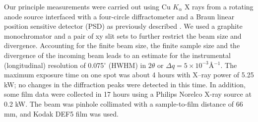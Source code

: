 


Our principle measurements were carried out using Cu $K_{\alpha}$ X rays
from a rotating anode source interfaced with a four-circle diffractometer 
and a Braun linear 
position sensitive detector (PSD) as previously described \cite{Sun94}. 
We used a graphite monochromator and a pair of xy slit sets to further
restrict the beam size and divergence.
Accounting for the finite beam size, the finite sample size and the divergence
of the incoming beam leads to an estimate for the instrumental (longitudinal)
resolution of 0.075$^{\circ}$ (HWHM) in
$2 \theta$ or $\Delta q = 5 \times 10^{-3}$\AA$ ^{-1}$.  
The maximum exposure time on one spot was about 4 hours with X--ray 
power of 5.25 kW; no changes in the diffraction peaks were detected
in this time. In addition, some film data were collected in 17 hours using a Philips Norelco
 X-ray source at 0.2 kW.  The beam was pinhole collimated with a sample-to-film
distance of 66 mm, and Kodak DEF5 film was used.

